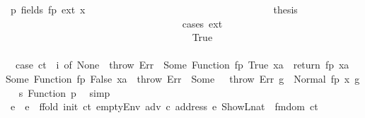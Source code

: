 \begin{isabellebody}
\ p{}{\isacharcolon}{\kern0pt}\ {\isacharparenleft}{\kern0pt}fields\ fp\ ext\ x{\isacharparenright}{\kern0pt}\isanewline
\ \ \ \ \ \ \ \ \ \ \ \ \ \ \ \ \ \ \ \ \ \ \ \ \ \ \ \ \ \ \ \ \ \ \isamarkupfalse%
\ \isamarkupfalse%
\ {\isacharquery}{\kern0pt}thesis\isanewline
\ \ \ \ \ \ \ \ \ \ \ \ \ \ \ \ \ \ \ \ \ \ \ \ \ \ \ \ \ \ \ \ \ \ \isamarkupfalse%
\ {\isacharparenleft}{\kern0pt}cases\ ext{\isacharparenright}{\kern0pt}\isanewline
\ \ \ \ \ \ \ \ \ \ \ \ \ \ \ \ \ \ \ \ \ \ \ \ \ \ \ \ \ \ \ \ \ \ \ \ \isamarkupfalse%
\ True\isanewline
\ \ \ \ \ \ \ \ \ \ \ \ \ \ \ \ \ \ \ \ \ \ \ \ \ \ \ \ \ \ \ \ \ \ \ \ \isamarkupfalse%
\ \isamarkupfalse%
\ {}{\isacharcolon}{\kern0pt}\ {\isachardoublequoteopen}{\isacharparenleft}{\kern0pt}case\ ct\ {\isachardollar}{\kern0pt}{\isachardollar}{\kern0pt}\ i\ of\ None\ {\isasymRightarrow}\ throw\ Err\ {\isacharbar}{\kern0pt}\ Some\ {\isacharparenleft}{\kern0pt}Function\ {\isacharparenleft}{\kern0pt}fp{\isacharcomma}{\kern0pt}\ True{\isacharcomma}{\kern0pt}\ xa{\isacharparenright}{\kern0pt}{\isacharparenright}{\kern0pt}\ {\isasymRightarrow}\ return\ {\isacharparenleft}{\kern0pt}fp{\isacharcomma}{\kern0pt}\ xa{\isacharparenright}{\kern0pt}\ {\isacharbar}{\kern0pt}\ Some\ {\isacharparenleft}{\kern0pt}Function\ {\isacharparenleft}{\kern0pt}fp{\isacharcomma}{\kern0pt}\ False{\isacharcomma}{\kern0pt}\ xa{\isacharparenright}{\kern0pt}{\isacharparenright}{\kern0pt}\ {\isasymRightarrow}\ throw\ Err\ {\isacharbar}{\kern0pt}\ Some\ {\isacharunderscore}{\kern0pt}\ {\isasymRightarrow}\ throw\ Err{\isacharparenright}{\kern0pt}\ g{\isacharprime}{\kern0pt}\ {\isacharequal}{\kern0pt}\ Normal\ {\isacharparenleft}{\kern0pt}{\isacharparenleft}{\kern0pt}fp{\isacharcomma}{\kern0pt}\ x{\isacharparenright}{\kern0pt}{\isacharcomma}{\kern0pt}\ g{\isacharprime}{\kern0pt}{\isacharparenright}{\kern0pt}{\isachardoublequoteclose}\ \isamarkupfalse%
\ s{}\ Function\ p{}\ \isamarkupfalse%
\ simp\isanewline
\ \ \ \ \ \ \ \ \ \ \ \ \ \ \ \ \ \ \ \ \ \ \ \ \ \ \ \ \ \ \ \ \ \ \ \ \isamarkupfalse%
\ e{\isacharprime}{\kern0pt}\ \ {\isachardoublequoteopen}e{\isacharprime}{\kern0pt}\ {\isacharequal}{\kern0pt}\ ffold\ {\isacharparenleft}{\kern0pt}init\ ct{\isacharparenright}{\kern0pt}\ {\isacharparenleft}{\kern0pt}emptyEnv\ adv\ c\ {\isacharparenleft}{\kern0pt}address\ e{\isacharparenright}{\kern0pt}\ {\isacharparenleft}{\kern0pt}ShowL\isactrlsub n\isactrlsub a\isactrlsub t\ {}{\isacharparenright}{\kern0pt}{\isacharparenright}{\kern0pt}\ {\isacharparenleft}{\kern0pt}fmdom\ ct{\isacharparenright}{\kern0pt}{\isachardoublequoteclose}\isanewline

\end{isabellebody}
